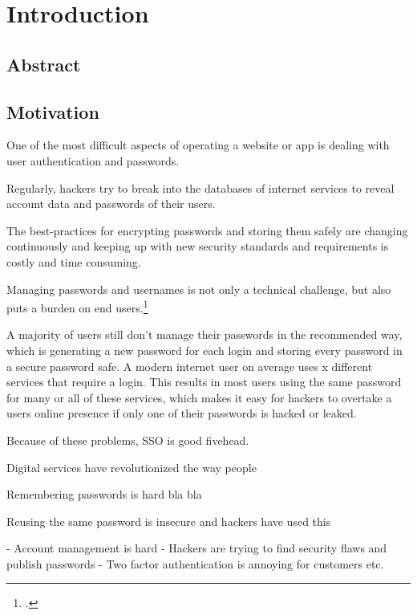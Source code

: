 \section{Introduction}
\subsection{Abstract}

\subsection{Motivation}

One of the most difficult aspects of operating a website or app is dealing with user
authentication and passwords.

Regularly, hackers try to break into the databases of internet services to reveal account data and 
passwords of their users.

The best-practices for encrypting passwords and storing them safely are changing
continuously and keeping up with new security standards and requirements is costly and time consuming.

Managing passwords and usernames is not only a technical challenge, but also puts a burden
on end users.\footcite[Cp. ][p. 459]{Hoonakker2009}

A majority of users still don't manage their passwords in the recommended way, which is
generating a new password for each login and storing every password in a secure password safe.
A modern internet user on average uses x different services that require a login.
This results in most users using the same password for many or all of these services,
which makes it easy for hackers to overtake a users online presence if only one of their
passwords is hacked or leaked.

Because of these problems, SSO is good fivehead.







Digital services have revolutionized the way people 


Remembering passwords is hard bla bla

Reusing the same password is insecure and hackers have used this



- Account management is hard
- Hackers are trying to find security flaws and publish passwords
- Two factor authentication is annoying for customers etc.



